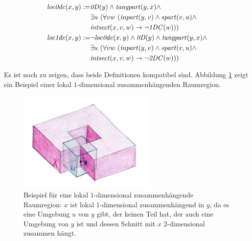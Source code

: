     \begin{dfn}
        \begin{align*}
            \Gloczerodc(x,y) := &\GzeroD(y) \land \Gtangpart(y,x) \land
                                \\
                                &\exists u\ (\forall v w\ (\Ginpart(y,v) \land \Gspart(v,u) \land
                                \\
                                &\Gintersect(x,v,w) \to \neg \GoneDC(w)))
                                \\
            \Gloconedc(x,y) := &\neg \Gloczerodc(x,y) \land \GzeroD(y) \land \Gtangpart(y,x) \land
                                \\
                                &\exists u\ (\forall v w\ (\Ginpart(y,v) \land \Gspart(v,u) \land
                                \\
                                &\Gintersect(x,v,w) \to \neg \GtwoDC(w)))
        \end{align*}

    \end{dfn}
%
    Es ist noch zu zeigen, dass beide Definitionen kompatibel sind.
    Abbildung \ref{fig:loc1dc} zeigt ein Beispiel einer lokal $1$-dimensional zusammenhängenden Raumregion.

    \begin{figure}[ht]
            \centering
            \includegraphics[width=0.6\textwidth]{abb/loc1dc.png}
            \caption[Beispiel für eine lokal $1$-dimensional zusammenhängende Raumregion]{Beispiel für eine lokal $1$-dimensional zusammenhängende Raumregion: $x$ ist lokal $1$-dimensional zusammenhängend in $y$, da es eine Umgebung $u$ von $y$ gibt, der keinen Teil hat, der auch eine Umgebung von $y$ ist und dessen Schnitt mit $x$ $2$-dimensional zusammen hängt.}
            \label{fig:loc1dc}
    \end{figure}
